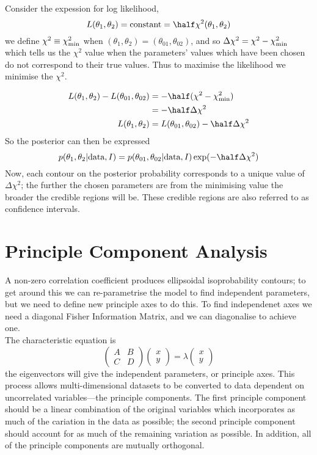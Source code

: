 \documentclass{dwnotes}         		        %
\begin{document}
Consider the expession for log likelihood,
\[ L(\theta_1, \theta_2) = \text{constant} = \half \chi^2 (\theta_1,
\theta_2) \] we define $\chi^2 \equiv \chi^2_{\rm min}$ when
$(\theta_1, \theta_2) = (\theta_{01}, \theta_{02})$, and so $\Delta
\chi^2 = \chi^2 - \chi^2_{\rm min}$ which tells us the $\chi^2$ value
when the parameters' values which have been chosen do not correspond
to their true values. Thus to maximise the likelihood we minimise the
$\chi^2$.

\begin{align*}
  L(\theta_1, \theta_2) - L(\theta_{01}, \theta_{02}) &= - \half (\chi^2 - \chi^2_{\rm min}) \\ &= - \half \Delta \chi^2 \\
  L(\theta_1, \theta_2) &= L(\theta_{01}, \theta_{02}) - \half \Delta
  \chi^2
\end{align*}
So the posterior can then be expressed
\[ p(\theta_1, \theta_2 | \text{data}, I) = p(\theta_{01}, \theta_{02}
| \text{data}, I) \exp( - \half \Delta \chi^2) \] Now, each contour on
the posterior probability corresponds to a unique value of $\Delta
\chi^2$; the further the chosen parameters are from the minimising
value the broader the credible regions will be. These credible regions
are also referred to as confidence intervals.

\section{Principle Component Analysis}
\label{sec:princ-comp-analys}

A non-zero correlation coefficient produces ellipsoidal isoprobability
contours; to get around this we can re-parametrise the model to find
independent parameters, but we need to define new principle axes to do
this. To find independenet axes we need a diagonal Fisher Information
Matrix, and we can diagonalise to achieve one. \\
The characteristic equation is
\begin{equation}
  \label{eq:3}
  \begin{pmatrix}
    A & B \\ C & D
  \end{pmatrix}
  \begin{pmatrix}
    x \\ y
  \end{pmatrix}
= \lambda
\begin{pmatrix}
  x \\ y
\end{pmatrix}
\end{equation}
the eigenvectors will give the independent parameters, or principle
axes. This process allows multi-dimensional datasets to be converted
to data dependent on uncorrelated variables---the principle
components. The first principle component should be a linear
combination of the original variables which incorporates as much of
the cariation in the data as possible; the second principle component
should account for as much of the remaining variation as possible. In
addition, all of the principle components are mutually orthogonal.
\end{document}
